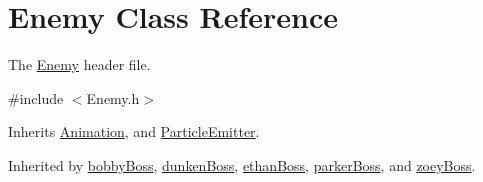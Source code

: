 \hypertarget{class_enemy}{\section{Enemy Class Reference}
\label{class_enemy}
}


The \hyperlink{class_enemy}{Enemy} header file.  




{\ttfamily \#include $<$Enemy.\+h$>$}



Inherits \hyperlink{class_animation}{Animation}, and \hyperlink{class_particle_emitter}{Particle\+Emitter}.



Inherited by \hyperlink{classbobby_boss}{bobby\+Boss}, \hyperlink{classdunken_boss}{dunken\+Boss}, \hyperlink{classethan_boss}{ethan\+Boss}, \hyperlink{classparker_boss}{parker\+Boss}, and \hyperlink{classzoey_boss}{zoey\+Boss}.

